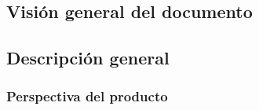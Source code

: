 \documentclass{article}
\begin{document}







    \subsection{Visión general del documento}








    \subsection{Descripción general}

        \subsubsection{Perspectiva del producto}




\end{document}
